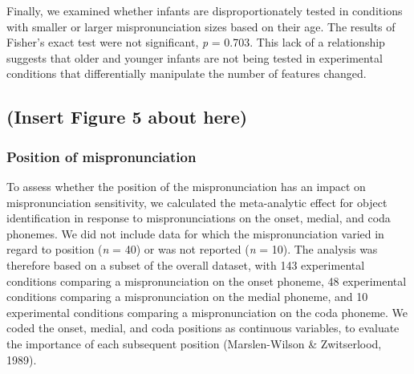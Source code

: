 \documentclass[man]{apa6}
\begin{document}
Finally, we examined whether infants are disproportionately tested in conditions with smaller or larger mispronunciation sizes based on their age. The results of Fisher's exact test were not significant, \emph{p} = 0.703. This lack of a relationship suggests that older and younger infants are not being tested in experimental conditions that differentially manipulate the number of features changed.

\hypertarget{insert-figure-5-about-here}{%
\subsection{(Insert Figure 5 about here)}\label{insert-figure-5-about-here}}

\hypertarget{position-of-mispronunciation}{%
\subsubsection{Position of mispronunciation}\label{position-of-mispronunciation}}

To assess whether the position of the mispronunciation has an impact on mispronunciation sensitivity, we calculated the meta-analytic effect for object identification in response to mispronunciations on the onset, medial, and coda phonemes. We did not include data for which the mispronunciation varied in regard to position (\emph{n} = 40) or was not reported (\emph{n} = 10). The analysis was therefore based on a subset of the overall dataset, with 143 experimental conditions comparing a mispronunciation on the onset phoneme, 48 experimental conditions comparing a mispronunciation on the medial phoneme, and 10 experimental conditions comparing a mispronunciation on the coda phoneme. We coded the onset, medial, and coda positions as continuous variables, to evaluate the importance of each subsequent position (Marslen-Wilson \& Zwitserlood, 1989).
\end{document}
